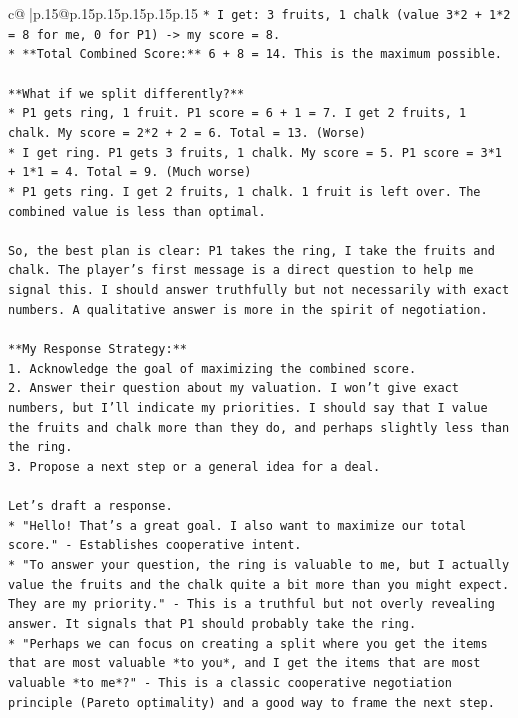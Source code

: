 \documentclass{article}
\begin{document}
{\begin{supertabular}{c@{$\;$}|p{.15\linewidth}@{}p{.15\linewidth}p{.15\linewidth}p{.15\linewidth}p{.15\linewidth}p{.15\linewidth}}
{{{\texttt{*   I get: 3 fruits, 1 chalk (value 3*2 + 1*2 = 8 for me, 0 for P1) {-}> my score = 8.} \\
\texttt{*   **Total Combined Score:** 6 + 8 = 14. This is the maximum possible.} \\
\\ 
\texttt{**What if we split differently?**} \\
\texttt{*   P1 gets ring, 1 fruit. P1 score = 6 + 1 = 7. I get 2 fruits, 1 chalk. My score = 2*2 + 2 = 6. Total = 13. (Worse)} \\
\texttt{*   I get ring. P1 gets 3 fruits, 1 chalk. My score = 5. P1 score = 3*1 + 1*1 = 4. Total = 9. (Much worse)} \\
\texttt{*   P1 gets ring. I get 2 fruits, 1 chalk. 1 fruit is left over. The combined value is less than optimal.} \\
\\ 
\texttt{So, the best plan is clear: P1 takes the ring, I take the fruits and chalk. The player's first message is a direct question to help me signal this. I should answer truthfully but not necessarily with exact numbers. A qualitative answer is more in the spirit of negotiation.} \\
\\ 
\texttt{**My Response Strategy:**} \\
\texttt{1.  Acknowledge the goal of maximizing the combined score.} \\
\texttt{2.  Answer their question about my valuation. I won't give exact numbers, but I'll indicate my priorities. I should say that I value the fruits and chalk more than they do, and perhaps slightly less than the ring.} \\
\texttt{3.  Propose a next step or a general idea for a deal.} \\
\\ 
\texttt{Let's draft a response.} \\
\texttt{*   "Hello! That's a great goal. I also want to maximize our total score." {-} Establishes cooperative intent.} \\
\texttt{*   "To answer your question, the ring is valuable to me, but I actually value the fruits and the chalk quite a bit more than you might expect. They are my priority." {-} This is a truthful but not overly revealing answer. It signals that P1 should probably take the ring.} \\
\texttt{*   "Perhaps we can focus on creating a split where you get the items that are most valuable *to you*, and I get the items that are most valuable *to me*?" {-} This is a classic cooperative negotiation principle (Pareto optimality) and a good way to frame the next step.} \\
}}}
\end{supertabular}}
\end{document}
